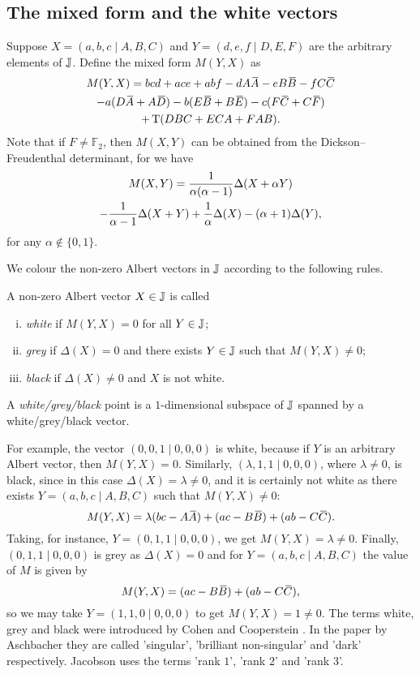 \subsection{The mixed form and the white vectors}
Suppose $X = (a,b,c \mid A,B,C)$ and $Y = (d,e,f\mid D,E,F)$ are the arbitrary elements
of $\mathbb{J}$. Define the mixed form
$M(Y,X)$ as
\begin{multline}
	M(Y,X) = bcd + ace + abf - d A\ovA  -e B \ovB - f C\ovC \\
	- a(D\ovA + A\ovD) - b(E\ovB + B\ovE) - c(F\ovC + C\ovF) \\
	+ \Tr(DBC + ECA + FAB). 
\end{multline}
Note that if $F \neq \mathbb{F}_2$, then $M(X,Y)$ can be obtained from the 
Dickson--Freudenthal
determinant, for we have
\begin{multline}
	M(X,Y) = \frac{1}{\alpha (\alpha - 1)} \Delta(X + \alpha Y) \\
	- \frac{1}{\alpha - 1} \Delta(X+Y) + \frac{1}{\alpha} \Delta(X) - (\alpha+1)\Delta(Y),
\end{multline}
for any $\alpha \not\in \{0,1\}$.

We colour the non-zero Albert vectors in $\mathbb{J}$ according to the following rules. 
\begin{definition}
	A non-zero Albert vector $X \in \mathbb{J}$ is called
	\begin{enumerate}[(i)]
		\item \textit{white} if $M(Y,X) = 0$ for all $Y \in \mathbb{J}$;
		\item \textit{grey} if $\Delta(X) = 0$ and there exists $Y \in \mathbb{J}$ such that 
			$M(Y,X) \neq 0$;
		\item \textit{black} if $\Delta(X) \neq 0$ and $X$ is not white.  
	\end{enumerate}
	A \textit{white/grey/black} point is a $1$-dimensional subspace of $\mathbb{J}$ spanned by a 
	white/grey/black vector. 
\end{definition}

For example, the vector $(0,0,1\mid 0,0,0)$ is white, because if $Y$
is an arbitrary Albert vector, then $M(Y,X) = 0$. Similarly, $(\lambda,1,1\mid 0,0,0)$,
where $\lambda \neq 0$, is black, since in this case $\Delta(X) = \lambda \neq 0$,
and it is certainly not white as there exists $Y = (a,b,c\mid A,B,C)$ such that 
$M(Y,X)\neq 0$:
\begin{equation}
	M(Y,X) = \lambda (bc - A\ovA) + (ac - B\ovB) + (ab - C\ovC). 
\end{equation}
Taking, for instance, $Y = (0,1,1\mid 0,0,0)$, we get $M(Y,X) = \lambda \neq 0$. Finally, 
$(0,1,1\mid 0,0,0)$ is grey as $\Delta(X) = 0$ and for $Y = (a,b,c\mid A,B,C)$ the
value of $M$ is given by
\begin{equation}
	M(Y,X) = (ac - B\ovB) + (ab - C\ovC),
\end{equation}
so we may take $Y = (1,1,0\mid 0,0,0)$ to get $M(Y,X) = 1 \neq 0$. 
The terms white, grey and black were introduced by Cohen and Cooperstein 
\cite{CC}. In the paper by Aschbacher \cite{Asch1} they are called
'singular', 'brilliant non-singular' and 'dark' respectively. 
Jacobson \cite{Jac2} uses the terms 'rank $1$', 'rank $2$' and 'rank $3$'. 

